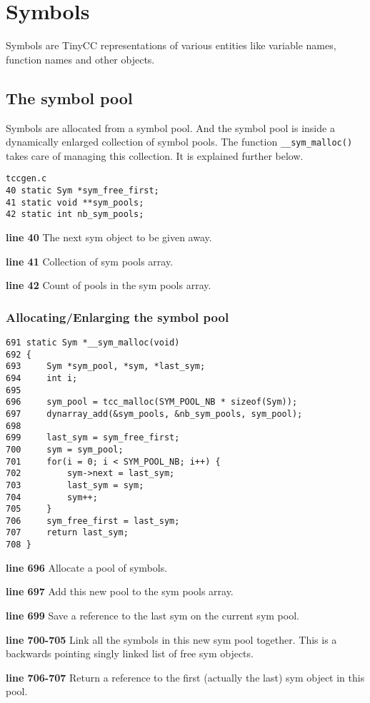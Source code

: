 
\chapter{Symbols}
Symbols are TinyCC representations of various entities like variable names, function names and other objects.


\section{The symbol pool}
Symbols are allocated from a symbol pool. And the symbol pool is inside a dynamically enlarged collection of symbol pools. The function \verb|__sym_malloc()| takes care of managing this collection. It is explained further below.

\begin{verbatim}
tccgen.c
40 static Sym *sym_free_first;
41 static void **sym_pools;
42 static int nb_sym_pools;
\end{verbatim}
\begin{tcc_desc}
\textbf{line 40} The next sym object to be given away.

\textbf{line 41} Collection of sym pools array.

\textbf{line 42} Count of pools in the sym pools array.
\end{tcc_desc}

\subsection{Allocating/Enlarging the symbol pool}

\begin{verbatim}
691 static Sym *__sym_malloc(void)
692 {
693     Sym *sym_pool, *sym, *last_sym;
694     int i;
695 
696     sym_pool = tcc_malloc(SYM_POOL_NB * sizeof(Sym));
697     dynarray_add(&sym_pools, &nb_sym_pools, sym_pool);
698
699     last_sym = sym_free_first;
700     sym = sym_pool;
701     for(i = 0; i < SYM_POOL_NB; i++) {
702         sym->next = last_sym;
703         last_sym = sym;
704         sym++;
705     }
706     sym_free_first = last_sym;
707     return last_sym;
708 }
\end{verbatim}

\begin{tcc_desc}
\textbf{line 696} Allocate a pool of symbols.

\textbf{line 697} Add this new pool to the sym pools array.

\textbf{line 699} Save a reference to the last sym on the current sym pool.

\textbf{line 700-705} Link all the symbols in this new sym pool together. This is a backwards pointing singly linked list of free sym objects.

\textbf{line 706-707} Return a reference to the first (actually the last) sym object in this pool.
\end{tcc_desc}

